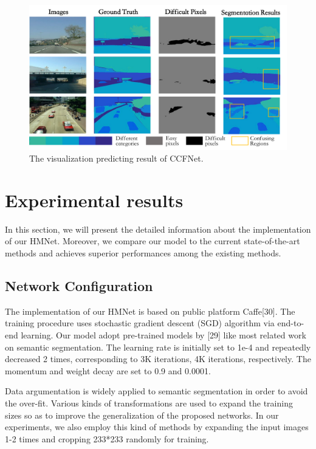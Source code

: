 \documentclass[10.5pt,compsoc]{TsT}
\theoremstyle{mystyle}
\begin{document}
{\begin{figure}[ht]
\centering
\includegraphics[width=1.9\columnwidth]{fig3.png}
\caption{The visualization predicting result of CCFNet.}
\label{fig:sift}
\end{figure} 

\section{Experimental results}
\label{s:results}
\noindent
In this section, we will present the detailed information about the implementation of our HMNet. Moreover, we compare our model to the current state-of-the-art methods and achieves superior performances among the existing methods.

\subsection{Network Configuration}
\noindent
The implementation of our HMNet is based on public platform Caffe[30]. The training procedure uses stochastic gradient descent (SGD) algorithm via end-to-end learning. Our model adopt pre-trained models by [29] like most related work on semantic segmentation. The learning rate is initially set to 1e-4 and repeatedly decreased 2 times, corresponding to 3K iterations, 4K iterations, respectively. The momentum and weight decay are set to 0.9 and 0.0001.

Data argumentation is widely applied to semantic segmentation in order to avoid the over-fit. Various kinds of transformations are used to expand the training sizes so as to improve the generalization of the proposed networks. In our experiments, we also employ this kind of methods by expanding the input images 1-2 times and cropping 233*233 randomly for training.  

}
\end{document}
